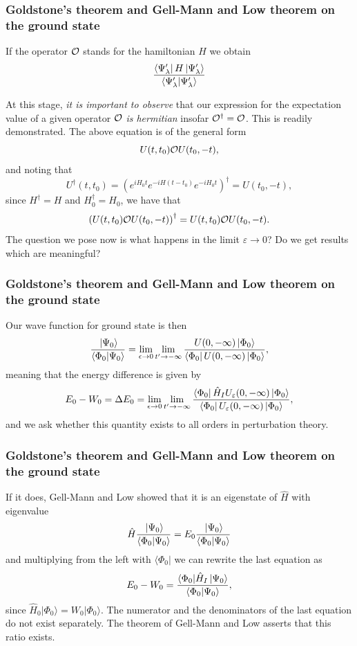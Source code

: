 \frame
{
\frametitle{Goldstone's theorem and Gell-Mann and Low theorem on the ground state}
\begin{small}
{\scriptsize
If the operator ${\cal O}$ stands for the hamiltonian $H$ we obtain
\[
    {\displaystyle  \frac{\bra{\Psi_{\lambda}'}H\,|{\Psi_{\lambda}'}\rangle }
   { \left\langle\Psi_{\lambda}' | \Psi_{\lambda}' \right\rangle} }
\]

At this stage, {\em it is important to observe} that our 
expression for the expectation value of a given operator ${\cal O}$
{\em is hermitian} insofar ${\cal O}^{\dagger}={\cal O}$. This is readily 
demonstrated. The above equation is of the general form
\[
U(t,t_0){\cal O}U(t_0,-t),
\]
and noting that 
\[
   U^{\dagger}(t,t_0)=
   \left({\displaystyle e^{iH_0t}e^{-iH(t-t_0)}e^{-iH_0t}}\right)^{\dagger}
   =U(t_0,-t),
\]
since $H^{\dagger}=H$ and $H_0^{\dagger}=H_0$, we have that
\[
    \left(U(t,t_0){\cal O}U(t_0,-t)\right)^{\dagger}
    =U(t,t_0){\cal O}U(t_0,-t).
\]
The question we pose now is what happens in the limit $\varepsilon\rightarrow 0$?
Do we get results which are meaningful?
}
\end{small}
}
\frame
{
\frametitle{Goldstone's theorem and Gell-Mann and Low theorem on the ground state}
\begin{small}
{\scriptsize
Our wave function for ground state is then
\[
        \frac{\,|{\Psi_0}\rangle}{\left\langle\Phi_0 | \Psi_0 \right\rangle}=
    \lim_{\epsilon \rightarrow 0}
   \lim_{t'\rightarrow -\infty}
   \frac{U(0,-\infty )\,|{\Phi_0}\rangle }
   { \bra{\Phi_0} U(0,-\infty )\,|{\Phi_0}\rangle },
\]
meaning that the energy difference is given by
\[
E_0-W_0=\Delta E_0= \lim_{\epsilon \rightarrow 0}
   \lim_{t'\rightarrow -\infty}
   \frac{\bra{\Phi_0}\hat{H}_IU_{\varepsilon}(0,-\infty )\,|{\Phi_0}\rangle }
   { \bra{\Phi_0} U_{\varepsilon}(0,-\infty )\,|{\Phi_0}\rangle },
\]
and we ask whether this quantity exists to all orders in perturbation theory.
}
\end{small}
}
\frame
{
\frametitle{Goldstone's theorem and Gell-Mann and Low theorem on the ground state}
\begin{small}
{\scriptsize
If it does, Gell-Mann and Low showed that it is an eigenstate of $\hat{H}$ with eigenvalue
\[
 \hat{H}\frac{\,|{\Psi_0}\rangle}{\left\langle\Phi_0 | \Psi_0 \right\rangle}= E_0\frac{\,|{\Psi_0}\rangle}{\left\langle\Phi_0 | \Psi_0 \right\rangle}
\]
and multiplying from the left with $\langle \Phi_0|$ we can rewrite the last equation
as
\[
E_0-W_0=\frac{\langle \Phi_0|\hat{H}_I\,|{\Psi_0}\rangle}{\left\langle\Phi_0 | \Psi_0 \right\rangle},
\]
since $\hat{H}_0|\Phi_0\rangle = W_0|\Phi_0\rangle$. The numerator and the denominators of the last equation do not exist separately. The theorem of Gell-Mann and Low asserts that this ratio exists. 
}
\end{small}
}

